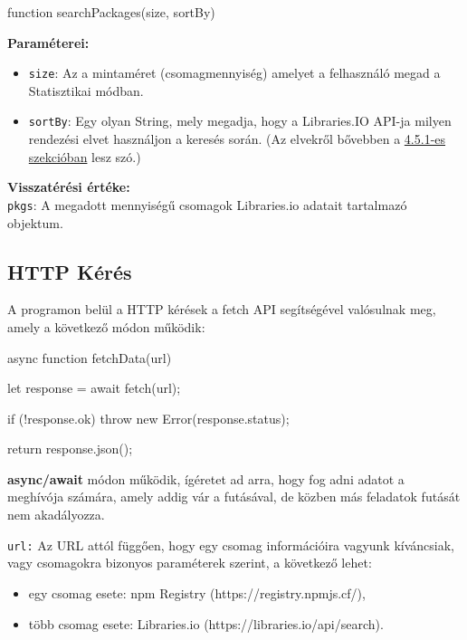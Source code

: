 \begin{js}
function searchPackages(size, sortBy)
\end{js}

\noindent \textbf{Paraméterei:}

\begin{itemize}
	\item \texttt{size}: Az a mintaméret (csomagmennyiség) amelyet a felhasználó megad a Statisztikai módban.
	\item \texttt{sortBy}: Egy olyan String, mely megadja, hogy a Libraries.IO API-ja milyen rendezési elvet használjon a keresés során. (Az elvekről bővebben a \hyperlink{subsection.4.5.1}{4.5.1-es szekcióban} lesz szó.)
\end{itemize}

\noindent \textbf{Visszatérési értéke:} \\

\texttt{pkgs}: A megadott mennyiségű csomagok Libraries.io adatait tartalmazó objektum.\\
\pagebreak

\subsection{HTTP Kérés}

A programon belül a HTTP kérések a fetch API segítségével valósulnak meg, amely a következő módon működik:

\begin{js}
async function fetchData(url){
  let response = await fetch(url);

  if (!response.ok) {
    throw new Error(response.status);
  }

  return response.json();
}
\end{js}

\textbf{async/await} módon működik, ígéretet ad arra, hogy fog adni adatot a meghívója számára, amely addig vár a futásával, de közben más feladatok futását nem akadályozza.

\texttt{url:} Az URL attól függően, hogy egy csomag információira vagyunk kíváncsiak, vagy csomagokra bizonyos paraméterek szerint, a következő lehet:
\begin{itemize}
	\item egy csomag esete: npm Registry (https://registry.npmjs.cf/),
	\item több csomag esete: Libraries.io (https://libraries.io/api/search).
\end{itemize} 


